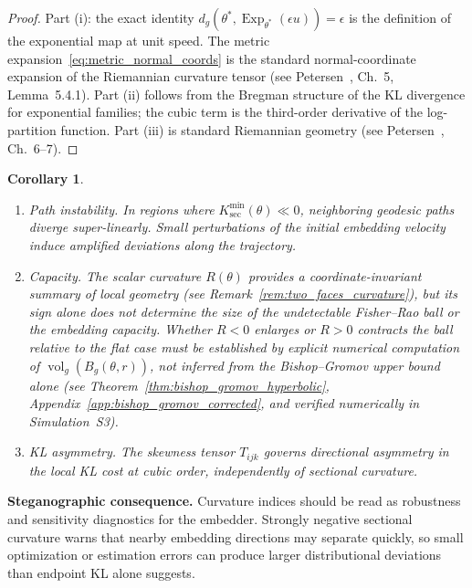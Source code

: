 \documentclass[a4paper,fleqn]{cas-dc}
\newtheorem{corollary}{Corollary}
\DeclareMathOperator{\Exp}{Exp}
\DeclareMathOperator{\vol}{vol}
\begin{document}
\begin{proof}
  Part (i): the exact identity $d_g(\theta^*,\Exp_{\theta^*}(\epsilon u))=\epsilon$
  is the definition of the exponential map at unit speed.
  The metric expansion~\eqref{eq:metric_normal_coords} is the standard
  normal-coordinate expansion of the Riemannian curvature tensor
  (see Petersen~\cite{petersen2016riemannian}, Ch.~5, Lemma~5.4.1).
  Part (ii) follows from the Bregman structure of the KL divergence
  for exponential families; the cubic term is the third-order
  derivative of the log-partition function.
  Part (iii) is standard Riemannian geometry (see
  Petersen~\cite{petersen2016riemannian}, Ch.~6--7).
\end{proof}

\begin{corollary}%
  \label{cor:curvature_instability}
  \begin{enumerate}
    \item[(i)] \emph{Path instability.}
          In regions where $K_{\sec}^{\min}(\theta)\ll 0$,
          neighboring geodesic paths diverge super-linearly.
          Small perturbations of the initial embedding velocity induce
          amplified deviations along the trajectory.
    \item[(ii)] \emph{Capacity.}
          The scalar curvature $R(\theta)$ provides a coordinate-invariant
          summary of local geometry (see Remark~\ref{rem:two_faces_curvature}),
          but its sign alone does \emph{not} determine the size of the
          undetectable Fisher--Rao ball or the embedding capacity.
          Whether $R<0$ enlarges or $R>0$ contracts the ball relative to
          the flat case must be established by explicit numerical computation
          of $\vol_g(B_g(\theta,r))$, not inferred from the Bishop--Gromov
          upper bound alone (see Theorem~\ref{thm:bishop_gromov_hyperbolic},
          Appendix~\ref{app:bishop_gromov_corrected}, and
          verified numerically in Simulation~S3).
    \item[(iii)] \emph{KL asymmetry.}
          The skewness tensor $T_{ijk}$ governs directional
          asymmetry in the local KL cost at cubic order, independently
          of sectional curvature.
  \end{enumerate}
\end{corollary}

\noindent\textbf{Steganographic consequence.}
Curvature indices should be read as robustness and sensitivity diagnostics for
the embedder. Strongly negative sectional curvature warns that nearby embedding
directions may separate quickly, so small optimization or estimation errors can
produce larger distributional deviations than endpoint KL alone suggests.
\end{document}
